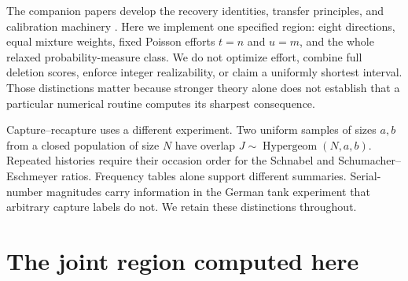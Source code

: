 \documentclass[11pt]{article}
\theoremstyle{remark}\newtheorem{remark}[theorem]{Remark}
\begin{document}
The companion papers develop the recovery identities, transfer principles,
and calibration machinery \cite{LongDiscovery,LongTransfer,LongCumulants,LongCapture}.
Here we implement one specified region: eight directions, equal mixture
weights, fixed Poisson efforts $t=n$ and $u=m$, and the whole relaxed
probability-measure class. We do not optimize effort, combine full deletion
scores, enforce integer realizability, or claim a uniformly shortest interval.
Those distinctions matter because stronger theory alone does not establish
that a particular numerical routine computes its sharpest consequence.

Capture--recapture uses a different experiment. Two uniform samples of sizes
$a,b$ from a closed population of size $N$ have overlap
$J\sim\operatorname{Hypergeom}(N,a,b)$. Repeated histories require their
occasion order for the Schnabel and Schumacher--Eschmeyer ratios. Frequency
tables alone support different summaries. Serial-number magnitudes carry
information in the German tank experiment that arbitrary capture labels do
not. We retain these distinctions throughout.

\section{The joint region computed here}
\end{document}
